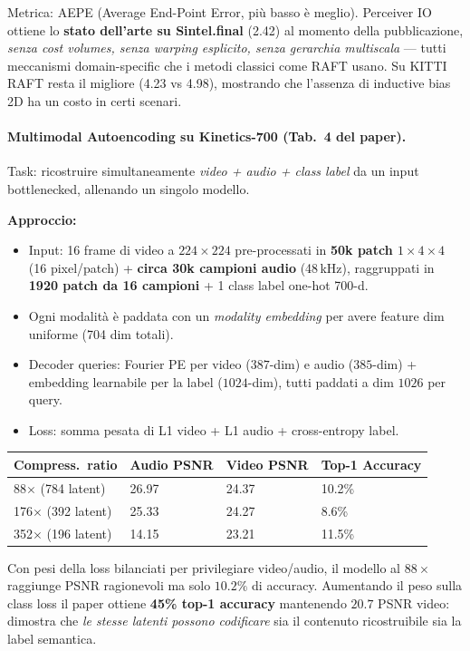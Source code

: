 \documentclass[
  11pt,
]{article}
\begin{document}
Metrica: AEPE (Average End-Point Error, più basso è meglio). Perceiver IO ottiene lo \textbf{stato dell'arte su Sintel.final} (2.42) al momento della pubblicazione, \emph{senza cost volumes, senza warping esplicito, senza gerarchia multiscala} --- tutti meccanismi domain-specific che i metodi classici come RAFT usano. Su KITTI RAFT resta il migliore (4.23 vs 4.98), mostrando che l'assenza di inductive bias 2D ha un costo in certi scenari.

\paragraph{Multimodal Autoencoding su Kinetics-700 (Tab.\ 4 del paper).} Task: ricostruire simultaneamente \emph{video + audio + class label} da un input bottlenecked, allenando un singolo modello.

\textbf{Approccio:}
\begin{itemize}\setlength\itemsep{0.1em}
\item Input: 16 frame di video a $224\times224$ pre-processati in \textbf{50k patch $1\times 4\times 4$} (16 pixel/patch) + \textbf{circa 30k campioni audio} (48\,kHz), raggruppati in \textbf{1920 patch da 16 campioni} + 1 class label one-hot 700-d.
\item Ogni modalità è paddata con un \emph{modality embedding} per avere feature dim uniforme (704 dim totali).
\item Decoder queries: Fourier PE per video ($387$-dim) e audio ($385$-dim) + embedding learnabile per la label ($1024$-dim), tutti paddati a dim $1026$ per query.
\item Loss: somma pesata di L1 video + L1 audio + cross-entropy label.
\end{itemize}

{\small
\begin{longtable}{@{}p{3cm} p{2.5cm} p{2.5cm} p{3cm}@{}}
\toprule
\textbf{Compress.\ ratio} & \textbf{Audio PSNR} & \textbf{Video PSNR} & \textbf{Top-1 Accuracy} \\
\midrule
\endhead
88$\times$ (784 latent) & 26.97 & 24.37 & 10.2\% \\[2pt]
176$\times$ (392 latent) & 25.33 & 24.27 & 8.6\% \\[2pt]
352$\times$ (196 latent) & 14.15 & 23.21 & 11.5\% \\
\bottomrule
\end{longtable}
}

\begin{notabox}[title={\textbf{Trade-off ricostruzione vs classificazione}}]
Con pesi della loss bilanciati per privilegiare video/audio, il modello al $88\times$ raggiunge PSNR ragionevoli ma solo $10.2\%$ di accuracy. Aumentando il peso sulla class loss il paper ottiene \textbf{45\% top-1 accuracy} mantenendo $20.7$ PSNR video: dimostra che \emph{le stesse latenti possono codificare} sia il contenuto ricostruibile sia la label semantica.
\end{notabox}
\end{document}
